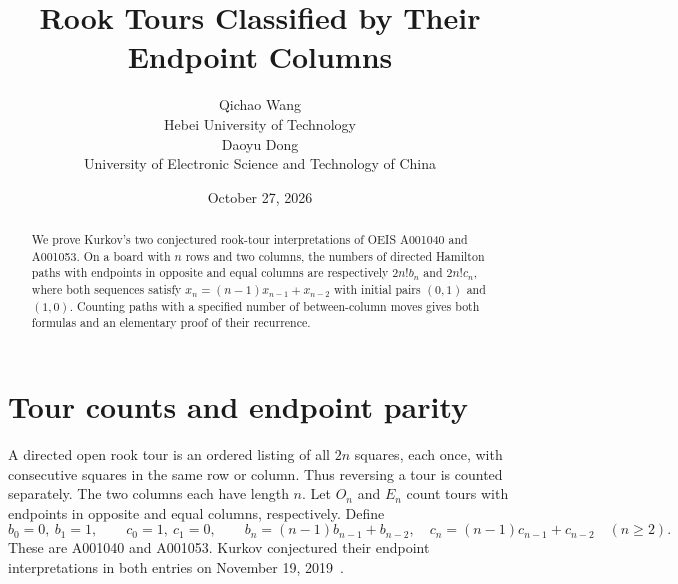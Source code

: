 \documentclass[10pt]{article}
\title{Rook Tours Classified by Their Endpoint Columns}
\author{Qichao Wang\\{\small Hebei University of Technology}\\[0.3em]
Daoyu Dong\\{\small University of Electronic Science and Technology of China}}
\date{October 27, 2026}
\begin{document}
\maketitle
\vspace{-1em}
\begin{abstract}
We prove Kurkov's two conjectured rook-tour interpretations of OEIS A001040 and A001053. On a board with $n$ rows and two columns, the numbers of directed Hamilton paths with endpoints in opposite and equal columns are respectively $2n!b_n$ and $2n!c_n$, where both sequences satisfy $x_n=(n-1)x_{n-1}+x_{n-2}$ with initial pairs $(0,1)$ and $(1,0)$. Counting paths with a specified number of between-column moves gives both formulas and an elementary proof of their recurrence.
\end{abstract}

\section{Tour counts and endpoint parity}
A directed open rook tour is an ordered listing of all $2n$ squares, each once, with consecutive squares in the same row or column. Thus reversing a tour is counted separately. The two columns each have length $n$. Let $O_n$ and $E_n$ count tours with endpoints in opposite and equal columns, respectively. Define
\[
 b_0=0,\ b_1=1,\qquad c_0=1,\ c_1=0,\qquad
 b_n=(n-1)b_{n-1}+b_{n-2},\quad
 c_n=(n-1)c_{n-1}+c_{n-2}\quad(n\ge2).
\]
These are A001040 and A001053. Kurkov conjectured their endpoint interpretations in both entries on November 19, 2019~\cite{opposite,same}.
\end{document}
